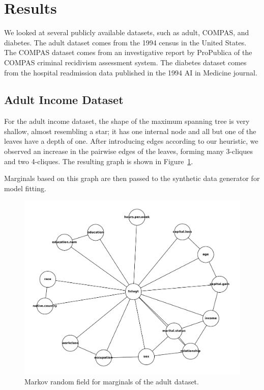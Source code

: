 \documentclass[acmsmall,sigconf]{acmart}
\begin{document}
\section{Results}

We looked at several publicly available datasets, such as adult\cite{adult_2,Kaggle_Adult_Census_Income}, COMPAS\cite{larson2016propublica,Kaggle_COMPAS_Dataset}, and diabetes\cite{diabetes_34,Kaggle_Diabetes_Prediction}. The adult dataset comes from the 1994 census in the United States. The COMPAS dataset comes from an investigative report by ProPublica of the COMPAS criminal recidivism assessment system. The diabetes dataset comes from the hospital readmission data published in the 1994 AI in Medicine journal.

\subsection{Adult Income Dataset}

For the adult income dataset, the shape of the maximum spanning tree is very shallow, almost resembling a star; it has one internal node and all but one of the leaves have a depth of one. After introducing edges according to our heuristic, we observed an increase in the pairwise edges of the leaves, forming many 3-cliques and two 4-cliques. The resulting graph is shown in Figure~\ref{fig:adult_mst}.

Marginals based on this graph are then passed to the synthetic data generator for model fitting.

\begin{figure}[h]
\centering
\includegraphics[width=\linewidth]{adult_mst}
\caption{Markov random field for marginals of the adult dataset.}
\label{fig:adult_mst}
\end{figure}
\end{document}
